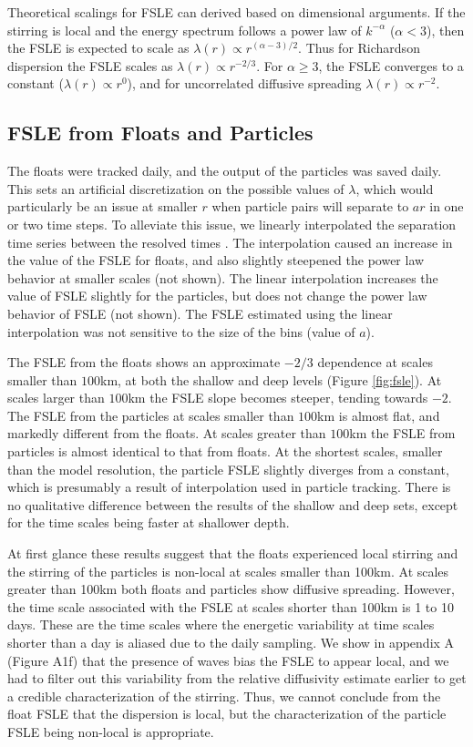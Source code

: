 \documentclass[]{ametsoc}
\begin{document}
Theoretical scalings for FSLE can derived based on dimensional arguments. If the stirring is local and the energy spectrum follows a power law of $k^{-\alpha}$ ($\alpha<3$), then the FSLE is expected to scale as $\lambda(r) \propto r^{(\alpha-3)/2}$. Thus for Richardson dispersion the FSLE scales as $\lambda(r) \propto r^{-2/3}$. For $\alpha \geq 3$, the FSLE converges to a constant ($\lambda(r) \propto r^{0}$), and for uncorrelated diffusive spreading $\lambda(r) \propto r^{-2}$.

\subsection{FSLE from Floats and Particles}
The floats were tracked daily, and the output of the particles was saved daily. This sets an artificial discretization on the possible values of $\lambda$, which would particularly be an issue at smaller $r$ when particle pairs will separate to $ar$ in one or two time steps. To alleviate this issue, we linearly interpolated the separation time series between the resolved times \citep{lumpkin2010surface, lacasce2008statistics, haza2014does}. The interpolation caused an increase in the value of the FSLE for floats, and also slightly steepened the power law behavior at smaller scales (not shown). The linear interpolation increases the value of FSLE slightly for the particles, but does not change the power law behavior of FSLE (not shown). The FSLE estimated using the linear interpolation was not sensitive to the size of the bins (value of $a$). 

The FSLE from the floats shows an approximate $-2/3$ dependence at scales smaller than $100$km, at both the shallow and deep levels (Figure \ref{fig:fsle}). At scales larger than $100$km the FSLE slope becomes steeper, tending towards $-2$. The FSLE from the particles at scales smaller than $100$km is almost flat, and markedly different from the floats. At scales greater than $100$km the FSLE from particles is almost identical to that from floats. At the shortest scales, smaller than the model resolution, the particle FSLE slightly diverges from a constant, which is presumably a result of interpolation used in particle tracking. There is no qualitative difference between the results of the shallow and deep sets, except for the time scales being faster at shallower depth.

At first glance these results suggest that the floats experienced local stirring and the stirring of the particles is non-local at scales smaller than 100km. At scales greater than 100km both floats and particles show diffusive spreading. However, the time scale associated with the FSLE at scales shorter than 100km is 1 to 10 days. These are the time scales where the energetic variability at time scales shorter than a day is aliased due to the daily sampling. We show in appendix A (Figure A1f) that the presence of waves bias the FSLE to appear local, and we had to filter out this variability from the relative diffusivity estimate earlier to get a credible characterization of the stirring. Thus, we cannot conclude from the float FSLE that the dispersion is local, but the characterization of the particle FSLE being non-local is appropriate.
\end{document}
